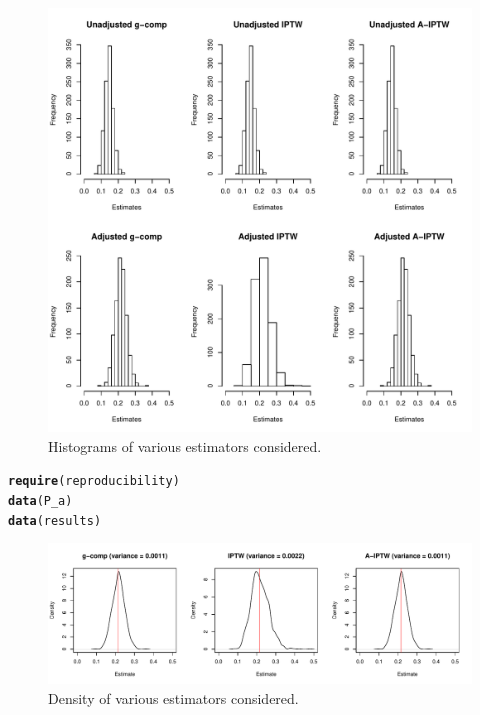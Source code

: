 \documentclass{article}\usepackage[]{graphicx}\usepackage[]{color}
\makeatletter
\newcommand{\hlstd}[1]{\textcolor[rgb]{0.345,0.345,0.345}{#1}}%
\newcommand{\hlkwd}[1]{\textcolor[rgb]{0.737,0.353,0.396}{\textbf{#1}}}%
\newenvironment{kframe}{%
 \def\at@end@of@kframe{}%
 \ifinner\ifhmode%
  \def\at@end@of@kframe{\end{minipage}}%
  \begin{minipage}{\columnwidth}%
 \fi\fi%
 \def\FrameCommand##1{\hskip\@totalleftmargin \hskip-\fboxsep
 \colorbox{shadecolor}{##1}\hskip-\fboxsep
     \hskip-\linewidth \hskip-\@totalleftmargin \hskip\columnwidth}%
 \MakeFramed {\advance\hsize-\width
   \@totalleftmargin\z@ \linewidth\hsize
   \@setminipage}}%
 {\par\unskip\endMakeFramed%
 \at@end@of@kframe}
\newenvironment{knitrout}{}{} %
\makeatother
\begin{document}
\begin{figure}[htbp]
\begin{center}
\includegraphics[width=5in]{histograms}
\caption{Histograms of various estimators considered.}
\label{fig:histogram}
\end{center}
\end{figure}

\begin{knitrout}
\color{fgcolor}\begin{kframe}
\begin{alltt}
\hlkwd{require}\hlstd{(reproducibility)}
\hlkwd{data}\hlstd{(P_a)}
\hlkwd{data}\hlstd{(results)}
\end{alltt}
\end{kframe}
\end{knitrout}

\begin{figure}[htbp]
\begin{center}
\begin{knitrout}
\color{fgcolor}
\includegraphics[width=5in]{figure/density-1} 

\end{knitrout}
\caption{Density of various estimators considered.}
\label{fig:density}
\end{center}
\end{figure}
\end{document}
